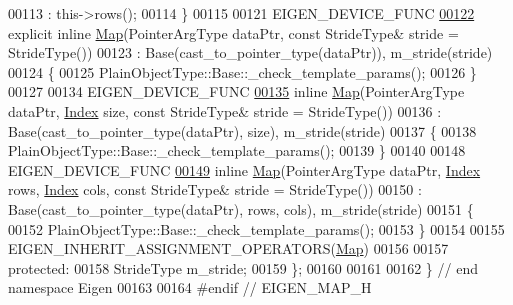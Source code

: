 \begin{DoxyCode}
00113            : this->rows();
00114     \}
00115 
00121     EIGEN\_DEVICE\_FUNC
\hyperlink{group___core___module_ac95a2928eaa9c727c4499d3723f8f459}{00122}     \textcolor{keyword}{explicit} \textcolor{keyword}{inline} \hyperlink{group___core___module_ac95a2928eaa9c727c4499d3723f8f459}{Map}(PointerArgType dataPtr, \textcolor{keyword}{const} StrideType& stride = StrideType())
00123       : Base(cast\_to\_pointer\_type(dataPtr)), m\_stride(stride)
00124     \{
00125       PlainObjectType::Base::\_check\_template\_params();
00126     \}
00127 
00134     EIGEN\_DEVICE\_FUNC
\hyperlink{group___core___module_a834d01d67c1401b022f00260e9dd2108}{00135}     \textcolor{keyword}{inline} \hyperlink{group___core___module_a834d01d67c1401b022f00260e9dd2108}{Map}(PointerArgType dataPtr, \hyperlink{namespace_eigen_a62e77e0933482dafde8fe197d9a2cfde}{Index} size, \textcolor{keyword}{const} StrideType& stride = StrideType())
00136       : Base(cast\_to\_pointer\_type(dataPtr), size), m\_stride(stride)
00137     \{
00138       PlainObjectType::Base::\_check\_template\_params();
00139     \}
00140 
00148     EIGEN\_DEVICE\_FUNC
\hyperlink{group___core___module_a8d94447f7900113cab8e7fd520800d39}{00149}     \textcolor{keyword}{inline} \hyperlink{group___core___module_a8d94447f7900113cab8e7fd520800d39}{Map}(PointerArgType dataPtr, \hyperlink{namespace_eigen_a62e77e0933482dafde8fe197d9a2cfde}{Index} rows, \hyperlink{namespace_eigen_a62e77e0933482dafde8fe197d9a2cfde}{Index} cols, \textcolor{keyword}{const} StrideType& stride = 
      StrideType())
00150       : Base(cast\_to\_pointer\_type(dataPtr), rows, cols), m\_stride(stride)
00151     \{
00152       PlainObjectType::Base::\_check\_template\_params();
00153     \}
00154 
00155     EIGEN\_INHERIT\_ASSIGNMENT\_OPERATORS(\hyperlink{group___core___module_class_eigen_1_1_map}{Map})
00156 
00157   \textcolor{keyword}{protected}:
00158     StrideType m\_stride;
00159 \};
00160 
00161 
00162 \} \textcolor{comment}{// end namespace Eigen}
00163 
00164 \textcolor{preprocessor}{#endif // EIGEN\_MAP\_H}
\end{DoxyCode}
